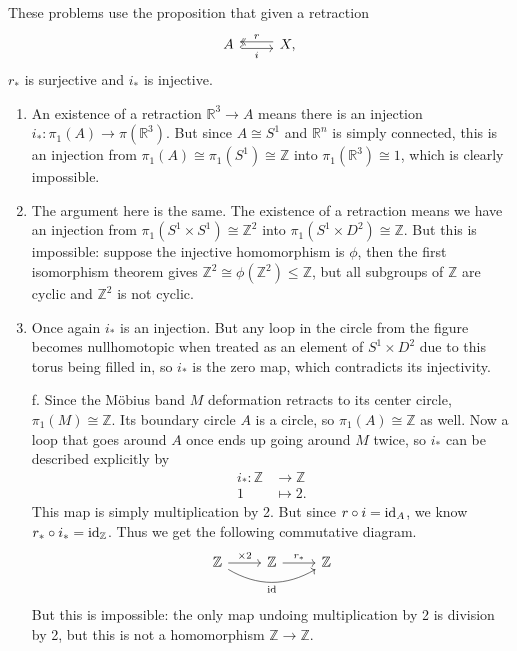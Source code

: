 \documentclass[twoside,10pt]{article}
\begin{document}
These problems use the proposition that given a retraction
\[
\begin{tikzcd}
	A \rar[hook,shift right,"i"'] & X \lar[two heads, shift right, "r"'],
\end{tikzcd}
\] $r_{*}$ is surjective and $i_{*}$ is injective.

\begin{enumerate}
	\item An existence of a retraction $\mathbb{R}^{3}\to A$ means there is an injection $i_{*}:\pi_1(A) \to \pi(\mathbb{R}^{3})$. But since $A \cong S^{1}$ and $\mathbb{R}^{n}$ is simply connected, this is an injection from $\pi_1(A) \cong \pi_1(S^{1}) \cong \mathbb{Z}$ into $\pi_1(\mathbb{R}^{3}) \cong 1$, which is clearly impossible.

	\item The argument here is the same. The existence of a retraction means we have an injection from $\pi_1(S^1 \times S^{1}) \cong \mathbb{Z}^{2}$ into $\pi_1(S^{1}\times D^2) \cong \mathbb{Z}$. But this is impossible: suppose the injective homomorphism is $\phi$, then the first isomorphism theorem gives $\mathbb{Z}^{2} \cong \phi(\mathbb{Z}^2) \leq \mathbb{Z}$, but all subgroups of $\mathbb{Z}$ are cyclic and $\mathbb{Z}^2$ is not cyclic.

	\item Once again $i_{*}$ is an injection. But any loop in the circle from the figure becomes nullhomotopic when treated as an element of $S^{1}\times D^2$ due to this torus being filled in, so $i_{*}$ is the zero map, which contradicts its injectivity.
	
	\item[f.] Since the M\"obius band $M$ deformation retracts to its center circle, $\pi_1(M) \cong \mathbb{Z}$. Its boundary circle $A$ is a circle, so $\pi_1(A) \cong \mathbb{Z}$ as well. Now a loop that goes around $A$ once ends up going around $M$ twice, so $i_{*}$ can be described explicitly by
		\begin{align*}
			i_{*}: \mathbb{Z} &\to \mathbb{Z} \\
			1 &\mapsto 2.
		\end{align*}
		This map is simply multiplication by 2. But since $r\circ i = \operatorname{id}_{A}$, we know $r_{*}\circ i_{*} = \operatorname{id}_{\mathbb{Z}}$. Thus we get the following commutative diagram.
		\[
		\begin{tikzcd}
			\mathbb{Z} \rar{\times 2} \arrow[rr,bend right, "\id"'] & \mathbb{Z} \rar{r_{*}} & \mathbb{Z}
		\end{tikzcd}
		\] 
		But this is impossible: the only map undoing multiplication by 2 is division by 2, but this is not a homomorphism $\mathbb{Z}\to \mathbb{Z}$.
\end{enumerate}
\end{document}
